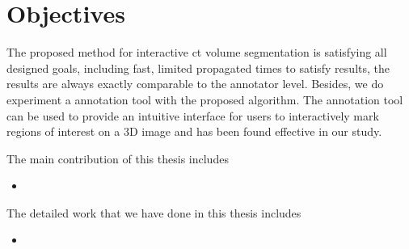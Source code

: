 \section{Objectives}
\label{sec:objectives}

The proposed method for interactive ct volume segmentation is satisfying all designed goals, including fast, limited propagated times to satisfy results, the results are always exactly comparable to the annotator level. Besides, we do experiment a annotation tool with the proposed algorithm. The annotation tool can be used to provide an intuitive interface for users to interactively mark regions of interest on a 3D image and has been found effective in our study.

The main contribution of this thesis includes
\begin{itemize}
    \item 
\end{itemize}
The detailed work that we have done in this thesis includes
\begin{itemize}
    \item 
\end{itemize}
